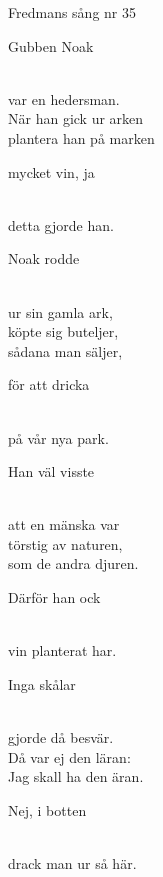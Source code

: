 \begin{song}{Fredmans sång nr 35}
	
	
	

    \showversenumber
	\begin{repetition}
		Gubben Noak
	\end{repetition}\\
	var en hedersman.\\
	När han gick ur arken\\
	plantera han på marken\\
	\begin{repetition}
		mycket vin, ja
	\end{repetition}\\
	detta gjorde han.
	
    \showversenumber
	\begin{repetition}
		Noak rodde
	\end{repetition}\\
	ur sin gamla ark,\\
	köpte sig buteljer,\\
	sådana man säljer,\\
	\begin{repetition}
		för att dricka
	\end{repetition}\\
	på vår nya park.
	
    \showversenumber	
	\begin{repetition}
		Han väl visste
	\end{repetition}\\
	att en mänska var\\
	törstig av naturen,\\
	som de andra djuren.\\
	\begin{repetition}
		Därför han ock
	\end{repetition}\\
	vin planterat har.
	
    \showversenumber	
	\begin{repetition}
		Inga skålar
	\end{repetition}\\
	gjorde då besvär.\\
	Då var ej den läran:\\
	Jag skall ha den äran.\\
	\begin{repetition}
		Nej, i botten
	\end{repetition}\\
	drack man ur så här.
	
\end{song}
